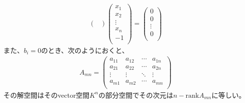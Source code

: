 \documentclass[dvipdfmx]{jsarticle}
\begin{document}
\begin{thm}
\begin{align*}
\begin{pmatrix}
\end{pmatrix}\begin{pmatrix}
x_{1} \\
x_{2} \\
 \vdots \\
x_{n} \\
 - 1 \\
\end{pmatrix} = \begin{pmatrix}
0 \\
0 \\
 \vdots \\
0 \\
\end{pmatrix}
\end{align*}
また、$b_{i} = 0$のとき、次のようにおくと、
\begin{align*}
A_{mn} = \begin{pmatrix}
a_{11} & a_{12} & \cdots & a_{1n} \\
a_{21} & a_{22} & \cdots & a_{2n} \\
 \vdots & \vdots & \ddots & \vdots \\
a_{m1} & a_{m2} & \cdots & a_{mn} \\
\end{pmatrix}\end{align*}
その解空間はそのvector空間$K^{n}$の部分空間でその次元は$n - {\mathrm{rank}}A_{mn}$に等しい。
\end{thm}
\end{document}
